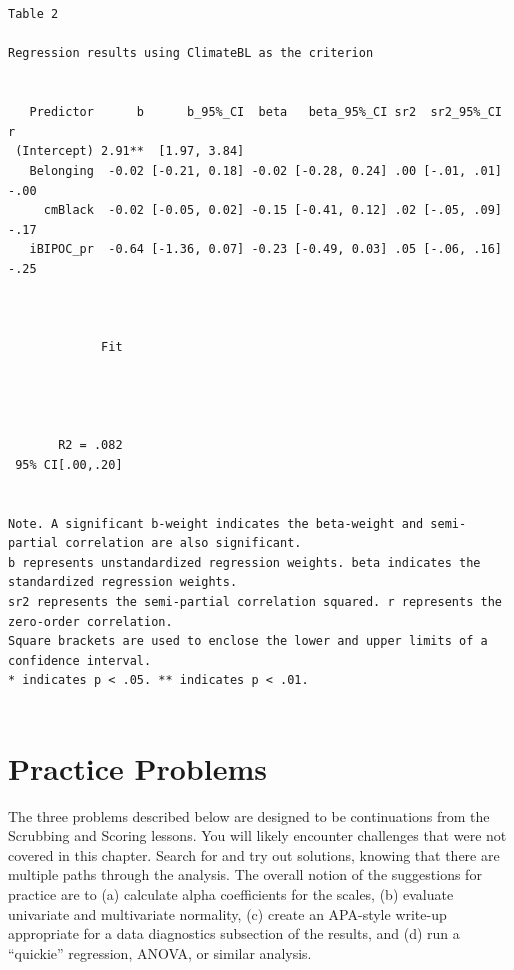 \documentclass[
  11pt,
]{book}
\begin{document}
\begin{verbatim}


Table 2 

Regression results using ClimateBL as the criterion
 

   Predictor      b      b_95%_CI  beta   beta_95%_CI sr2  sr2_95%_CI    r
 (Intercept) 2.91**  [1.97, 3.84]                                         
   Belonging  -0.02 [-0.21, 0.18] -0.02 [-0.28, 0.24] .00 [-.01, .01] -.00
     cmBlack  -0.02 [-0.05, 0.02] -0.15 [-0.41, 0.12] .02 [-.05, .09] -.17
   iBIPOC_pr  -0.64 [-1.36, 0.07] -0.23 [-0.49, 0.03] .05 [-.06, .16] -.25
                                                                          
                                                                          
                                                                          
             Fit
                
                
                
                
       R2 = .082
 95% CI[.00,.20]
                

Note. A significant b-weight indicates the beta-weight and semi-partial correlation are also significant.
b represents unstandardized regression weights. beta indicates the standardized regression weights. 
sr2 represents the semi-partial correlation squared. r represents the zero-order correlation.
Square brackets are used to enclose the lower and upper limits of a confidence interval.
* indicates p < .05. ** indicates p < .01.
 
\end{verbatim}

\hypertarget{practice-problems-2}{%
\section{Practice Problems}\label{practice-problems-2}}

The three problems described below are designed to be continuations from the Scrubbing and Scoring lessons. You will likely encounter challenges that were not covered in this chapter. Search for and try out solutions, knowing that there are multiple paths through the analysis. The overall notion of the suggestions for practice are to (a) calculate alpha coefficients for the scales, (b) evaluate univariate and multivariate normality, (c) create an APA-style write-up appropriate for a data diagnostics subsection of the results, and (d) run a ``quickie'' regression, ANOVA, or similar analysis.
\end{document}
